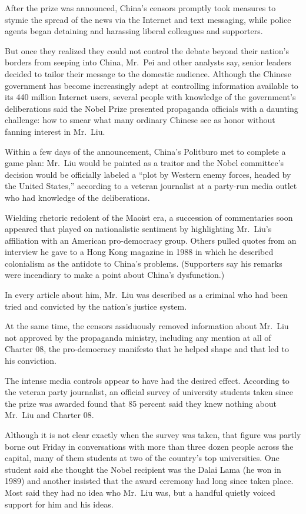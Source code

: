 ﻿\documentclass[12pt]{article}
\begin{document}
After the prize was announced, China's censors promptly took measures to stymie the spread of the
news via the Internet and text messaging, while police agents began detaining and harassing liberal
colleagues and supporters.

But once they realized they could not control the debate beyond their nation's borders from seeping
into China, Mr.~Pei and other analysts say, senior leaders decided to tailor their message to the
domestic audience. Although the Chinese government has become increasingly adept at controlling
information available to its 440 million Internet users, several people with knowledge of the
government's deliberations said the Nobel Prize presented propaganda officials with a daunting
challenge: how to smear what many ordinary Chinese see as honor without fanning interest in Mr.~Liu.

Within a few days of the announcement, China's Politburo met to complete a game plan: Mr.~Liu would
be painted as a traitor and the Nobel committee's decision would be officially labeled a ``plot by
Western enemy forces, headed by the United States,'' according to a veteran journalist at a
party-run media outlet who had knowledge of the deliberations.

Wielding rhetoric redolent of the Maoist era, a succession of commentaries soon appeared that played
on nationalistic sentiment by highlighting Mr.~Liu's affiliation with an American pro-democracy
group. Others pulled quotes from an interview he gave to a Hong Kong magazine in 1988 in which he
described colonialism as the antidote to China's problems. (Supporters say his remarks were
incendiary to make a point about China's dysfunction.)

In every article about him, Mr.~Liu was described as a criminal who had been tried and convicted by
the nation's justice system.

At the same time, the censors assiduously removed information about Mr.~Liu not approved by the
propaganda ministry, including any mention at all of Charter 08, the pro-democracy manifesto that he
helped shape and that led to his conviction.

The intense media controls appear to have had the desired effect. According to the veteran party
journalist, an official survey of university students taken since the prize was awarded found that
85 percent said they knew nothing about Mr.~Liu and Charter 08.

Although it is not clear exactly when the survey was taken, that figure was partly borne out Friday
in conversations with more than three dozen people across the capital, many of them students at two
of the country's top universities. One student said she thought the Nobel recipient was the Dalai
Lama (he won in 1989) and another insisted that the award ceremony had long since taken place. Most
said they had no idea who Mr.~Liu was, but a handful quietly voiced support for him and his ideas.
\end{document}
